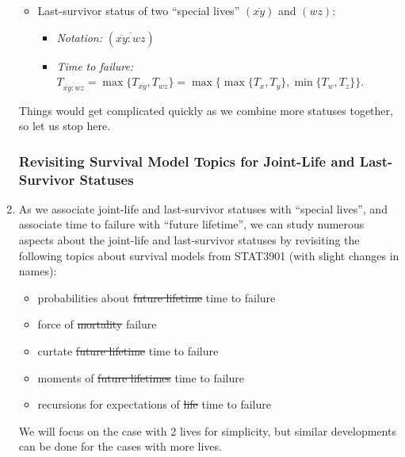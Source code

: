 \begin{enumerate}
\begin{itemize}
\item Last-survivor status of two ``special lives'' \((\overline{xy})\) and \((wz)\):
\begin{itemize}
\item \emph{Notation:} \((\overline{\overline{xy}\!:\!wz})\)
\item \emph{Time to failure:}
\(T_{\overline{\overline{xy}:wz}}=\max\{T_{\overline{xy}},T_{wz}\}
=\max\{\max\{T_x,T_y\},\min\{T_w,T_z\}\}\).
\end{itemize}

\end{itemize}
Things would get complicated quickly as we combine more statuses together, so
let us stop here.

\subsubsection*{Revisiting Survival Model Topics for Joint-Life and Last-Survivor Statuses}
\item As we associate joint-life and last-survivor statuses with ``special
lives'', and associate time to failure with ``future lifetime'', we can study
numerous aspects about the joint-life and last-survivor statuses by revisiting
the following topics about survival models from STAT3901 (with slight changes
in names):
\begin{itemize}
\item probabilities about \sout{future lifetime} time to failure
\item force of \sout{mortality} failure
\item curtate \sout{future lifetime} time to failure
\item moments of \sout{future lifetimes} time to failure
\item recursions for expectations of \sout{life} time to failure
\end{itemize}
\begin{note}
We will focus on the case with 2 lives for simplicity, but similar developments
can be done for the cases with more lives.
\end{note}


\end{enumerate}
